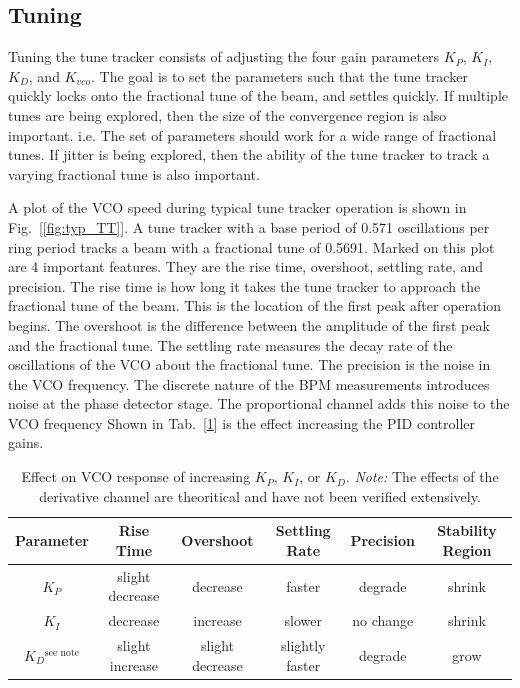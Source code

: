 \subsection{Tuning \label{Tuning}}
Tuning the tune tracker consists of adjusting the four gain parameters $K_P$, $K_I$, $K_D$, and $K_{vco}$.
The goal is to set the parameters such that the tune tracker quickly locks onto the fractional
tune of the beam, and settles quickly.  If multiple tunes are being explored, then the size of the convergence
region is also important.  i.e.  The set of parameters should work for a wide range of fractional tunes.
If jitter is being explored, then the ability of the tune tracker to track a varying fractional tune is
also important.

A plot of the VCO speed during typical tune tracker operation is shown in Fig.~[\ref{fig:typ_TT}].
A tune tracker with a base period of 0.571 oscillations per ring period tracks a beam with a
fractional tune of 0.5691.
Marked on this plot are 4 important features.  They are the rise time, overshoot, settling rate,
and precision.
The rise time is how long it takes the tune tracker to approach the fractional tune of the beam.
This is the location of the first peak after operation begins.  The overshoot is the difference
between the amplitude of the first peak and the fractional tune.  The settling rate
measures the decay rate of the oscillations of the VCO about the fractional tune.
The precision is the noise in the VCO frequency.  The discrete nature of the BPM measurements
introduces noise at the phase detector stage.  The proportional channel adds this
noise to the VCO frequency
Shown in Tab.~[\ref{tab:PID_params}] is the effect increasing the PID controller gains.

\begin{table}
\begin{tabular}{|c|ccccc|}
\hline
Parameter&  Rise Time&        Overshoot&        Settling Rate&      Precision&  Stability Region\\
\hline
$K_P$&      slight decrease&  decrease&         faster&             degrade&    shrink\\
$K_I$&      decrease&         increase&         slower&             no change&  shrink\\
$K_D$$^\textrm{see note}$&    slight increase&  slight decrease&  slightly faster&    degrade&    grow\\ 
\hline
\end{tabular}
\caption{Effect on VCO response of increasing $K_P$, $K_I$, or $K_D$. {\it Note:} The effects
of the derivative channel are theoritical and have not been verified extensively.}
\label{tab:PID_params}
\end{table}

